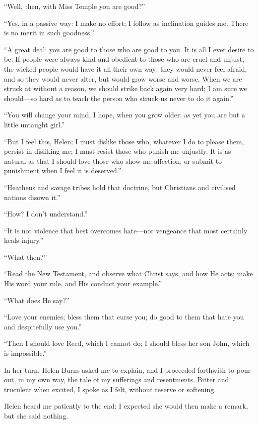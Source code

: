\enquote{Well, then, with Miss Temple you are good?}

\enquote{Yes, in a passive way: I make no effort; I follow as
inclination guides me.  There is no merit in such goodness.}

\enquote{A great deal: you are good to those who are good to you.  It is
all I ever desire to be.  If people were always kind and obedient to
those who are cruel and unjust, the wicked people would have it all
their own way: they would never feel afraid, and so they would never
alter, but would grow worse and worse.  When we are struck at without a
reason, we should strike back again very hard; I am sure we should---so
hard as to teach the person who struck us never to do it again.}

\enquote{You will change your mind, I hope, when you grow older: as yet
you are but a little untaught girl.}

\enquote{But I feel this, Helen; I must dislike those who, whatever I do
to please them, persist in disliking me; I must resist those who punish
me unjustly.  It is as natural as that I should love those who show me
affection, or submit to punishment when I feel it is deserved.}

\enquote{Heathens and savage tribes hold that doctrine, but Christians
and civilised nations disown it.}

\enquote{How?  I don't understand.}

\enquote{It is not violence that best overcomes hate---nor vengeance
that most certainly heals injury.}

\enquote{What then?}

\enquote{Read the New Testament, and observe what Christ says, and how
He acts; make His word your rule, and His conduct your example.}

\enquote{What does He say?}

\enquote{Love your enemies; bless them that curse you; do good to them
that hate you and despitefully use you.}

\enquote{Then I should love \Mrs{} Reed, which I cannot do; I should bless
her son John, which is impossible.}

In her turn, Helen Burns asked me to explain, and I proceeded forthwith
to pour out, in my own way, the tale of my sufferings and resentments. 
Bitter and truculent when excited, I spoke as I felt, without reserve or
softening.

Helen heard me patiently to the end: I expected she would then make a
remark, but she said nothing.


